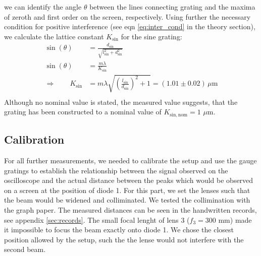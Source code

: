 we can identify the angle $\theta$ between the lines connecting grating and the maxima 
of zeroth and first order on the screen, respectively. Using further the 
necessary condition for positive interference (see eqn \eqref{eq:inter_cond} in the theory section), 
we calculate the lattice constant $K_\mathrm{sin}$ for the sine grating:
\begin{align}
    \sin(\theta)&= \frac{d_\mathrm{sin}}{\sqrt{l_\mathrm{sin}^2 + d_\mathrm{sin}^2}} \\
    \sin(\theta)&= \frac{m\lambda}{K_\mathrm{sin}} \\
    \Rightarrow \qquad 
    K_\mathrm{sin}    &= m \lambda\sqrt{\left(\frac{l_\mathrm{sin}}{d_\mathrm{sin}}\right)^2 + 1} 
        = (1.01 \pm 0.02) \, \mu\mathrm{m} \\
\end{align}
Although no nominal value is stated, the measured value suggests, that the grating has been 
constructed to a nominal value of $K_\mathrm{sin, nom} = 1$ $\mu$m. 

\subsection{Calibration}
For all further measurements, we needed to calibrate the setup and use the gauge gratings 
to establish the relationship between the signal observed on the oscilloscope and the 
actual distance between the peaks which would be observed on a screen at the position of diode 1. 
For this part, we set the lenses such that the beam would be widened and colliminated. We tested the collimination 
with the graph paper. The measured distances can be seen in the handwritten records, see appendix \ref{sec:records}.
The small focal lenght of lens 3 ($f_3 = 300$ mm) made it impossible to focus the beam exactly onto diode 1. We 
chose the closest position allowed by the setup, such the the lense would not interfere with the second beam. 

